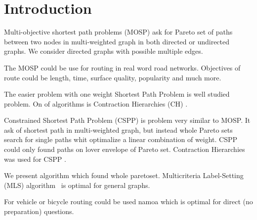 % 
%  
%  
%  

\section{Introduction}
\label{secIntroduction}

Multi-objective shortest path problems (MOSP) ask for Pareto set of paths
between two nodes in multi-weighted graph in both directed or undirected graphs. 
We consider directed graphs with possible multiple edges.

The MOSP could be use for routing in real word road networks. 
Objectives of route could be length, time, surface quality, popularity and much more.


The easier problem with one weight Shortest Path Problem is well studied problem.
On of algorithms is Contraction Hierarchies (CH) \cite{geisberger2008contraction}.

Constrained Shortest Path Problem (CSPP) is 
\cite{pugliese2013survey} problem very similar to MOSP.
It ask of shortest path in multi-weighted graph, but instead whole
Pareto sets search for single paths whit optimalize a linear combination
of weight. CSPP could only found paths on lover envelope of Pareto set.
Contraction Hierarchies was used for CSPP
 \cite{funke2013polynomial}.

We present algorithm which found whole paretoset.
Multicriteria Label-Setting (MLS) algorithm~\cite{martins1984multicriteria} 
is optimal for general graphs.

For vehicle or bicycle routing could be used namoa  which is optimal for direct (no preparation) questions.

